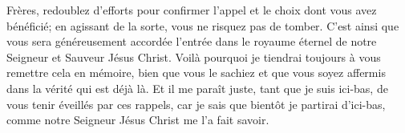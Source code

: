 Frères, redoublez d’efforts
		pour confirmer l’appel et le choix dont vous avez bénéficié;
	en agissant de la sorte, vous ne risquez pas de tomber.
C’est ainsi que vous sera généreusement accordée
	l’entrée dans le royaume éternel de notre Seigneur et Sauveur Jésus Christ.
Voilà pourquoi je tiendrai toujours à vous remettre cela en mémoire,
	bien que vous le sachiez
	et que vous soyez affermis dans la vérité qui est déjà là.
Et il me paraît juste, tant que je suis ici-bas,
	de vous tenir éveillés par ces rappels,
	car je sais que bientôt je partirai d’ici-bas,
	comme notre Seigneur Jésus Christ me l’a fait savoir.
